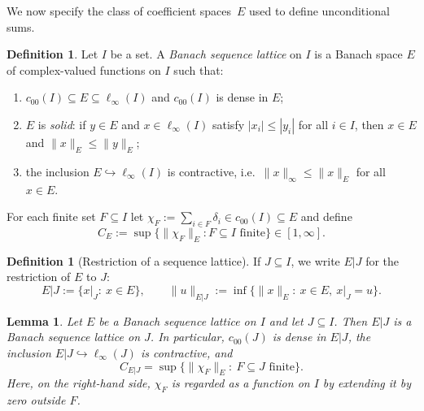 \documentclass[reqno]{amsart}
\theoremstyle{plain}
\newtheorem{lemma}[theorem]{Lemma}
\theoremstyle{definition}
\newtheorem{definition}[theorem]{Definition}
\theoremstyle{remark}
\renewcommand{\le}{\leqslant}
\begin{document}
We now specify the class of coefficient spaces~$E$ used to define unconditional sums.

\begin{definition}\label{def:sequence-lattice}
Let $I$ be a set. A \emph{Banach sequence lattice} on $I$ is a Banach space $E$
of complex-valued functions on $I$ such that:
\begin{enumerate}[label={\rm(\alph*)}]
\item $c_{00}(I)\subseteq E\subseteq \ell_\infty(I)$ and $c_{00}(I)$ is dense in $E$;
\item $E$ is \emph{solid}: if $y\in E$ and $x\in \ell_\infty(I)$ satisfy
$|x_i|\le |y_i|$ for all $i\in I$, then $x\in E$ and $\|x\|_E\le \|y\|_E$;
\item the inclusion $E\hookrightarrow \ell_\infty(I)$ is contractive, i.e.\ $\|x\|_\infty\le \|x\|_E$
for all $x\in E$.
\end{enumerate}
For each finite set $F\subseteq I$ let $\chi_F:=\sum_{i\in F}\delta_i\in c_{00}(I)\subseteq E$ and define
\[
C_E:=\sup\{\|\chi_F\|_E : F\subseteq I \text{ finite}\}\in [1,\infty].
\]
\end{definition}


\begin{definition}[Restriction of a sequence lattice]\label{def:restriction}
If $J\subseteq I$, we write $E|J$ for the restriction of $E$ to $J$:
\[
E|J := \{x|_J:\ x\in E\},\qquad \|u\|_{E|J}:=\inf\{\|x\|_E:\ x\in E,\ x|_J=u\}.
\]
\end{definition}

\begin{lemma}\label{lem:restriction-properties}
Let $E$ be a Banach sequence lattice on $I$ and let $J\subseteq I$.  Then $E|J$ is a Banach
sequence lattice on $J$.  In particular, $c_{00}(J)$ is dense in $E|J$, the inclusion
$E|J\hookrightarrow \ell_\infty(J)$ is contractive, and
\[
C_{E|J}=\sup\{\|\chi_F\|_E:\ F\subseteq J\text{ finite}\}.
\]
Here, on the right-hand side, $\chi_F$ is regarded as a function on $I$ by extending it by zero
outside $F$.
\end{lemma}
\end{document}
